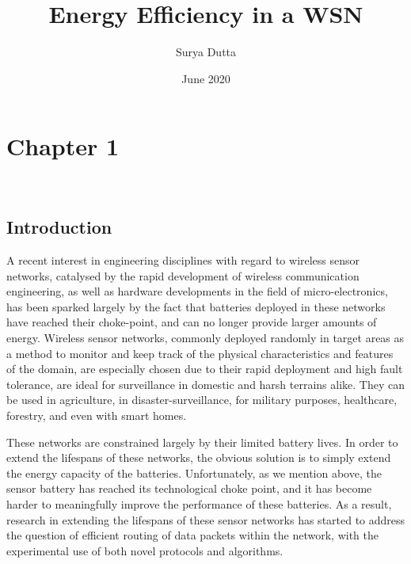 \documentclass{article}
\title{Energy Efficiency in a WSN}
\author{Surya Dutta }
\date{June 2020}
\begin{document}
\tableofcontents
\maketitle

\chapter{ \textbf{Chapter 1}}\\
\section{\textbf{Introduction}}
A recent interest in engineering disciplines with regard to  wireless sensor networks, catalysed by the rapid development of wireless communication engineering, as well as hardware developments in the field of micro-electronics, has been sparked largely by the fact that batteries deployed in these networks have reached their choke-point, and can no longer provide larger amounts of energy. Wireless sensor networks, commonly deployed randomly in target areas as a method to monitor and keep track of the physical characteristics and features of the domain, are especially chosen due to their rapid deployment and high fault tolerance, are ideal for surveillance in domestic and harsh terrains alike. They can be used in agriculture, in disaster-surveillance, for military purposes, healthcare, forestry, and even with smart homes. 

These networks are constrained largely by their limited battery lives. In order to extend the lifespans of these networks, the obvious solution is to simply extend the energy capacity of the batteries. Unfortunately, as we mention above, the sensor battery has reached its technological choke point, and it has become harder to meaningfully improve the performance of these batteries. As a result, research in extending the lifespans of these sensor networks has started to address the question of efficient routing of data packets within the network, with the experimental use of both novel protocols and algorithms. 
\end{document}
